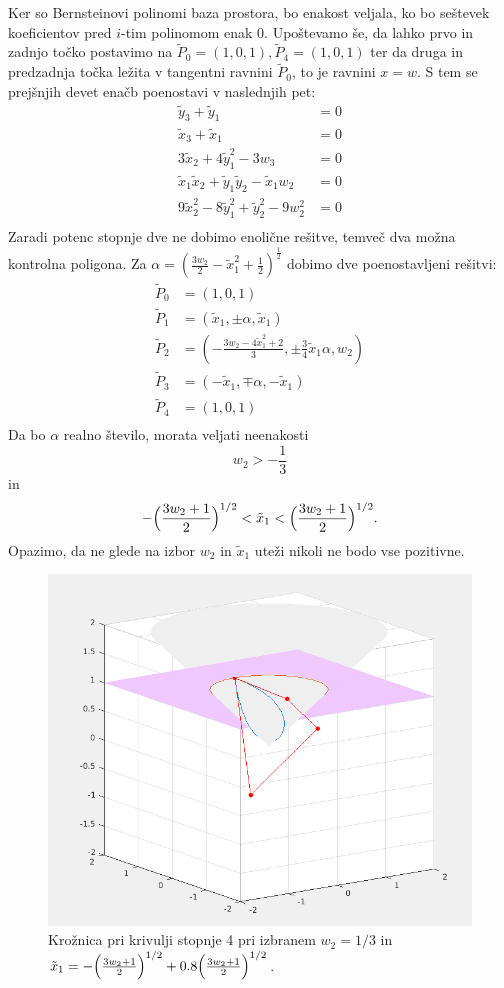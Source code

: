 \documentclass[a4paper,12pt]{article}
\begin{document}
Ker so Bernsteinovi polinomi baza prostora, bo enakost veljala, ko bo seštevek koeficientov pred $i$-tim polinomom enak 0. Upoštevamo še, da lahko prvo in zadnjo točko postavimo na $\tilde{P}_0 = (1,0, 1), \tilde{P}_4 = (1,0, 1)$ ter da druga in predzadnja točka ležita v tangentni ravnini $\tilde{P}_0$, to je ravnini $x = w$. S tem se prejšnjih devet enačb poenostavi v naslednjih pet:
\begin{align*}
\tilde{y}_3 + \tilde{y}_1 &= 0\\
\tilde{x}_3 + \tilde{x}_1 &= 0\\
3\tilde{x}_2 + 4\tilde{y}_1^2 - 3w_3 &= 0 \\
\tilde{x}_1\tilde{x}_2 + \tilde{y}_1\tilde{y}_2  - \tilde{x}_1w_2 &= 0 \\
9\tilde{x}_2^2 - 8\tilde{y}_1^2 + \tilde{y}_2^2 - 9w_2^2&= 0 \\
\end{align*}
Zaradi potenc stopnje dve ne dobimo enolične rešitve, temveč dva možna kontrolna poligona. Za $\alpha = (\frac{3w_2}{2} - \tilde{x}_1^2 + \frac{1}{2})^{\frac{1}{2}}$ dobimo dve poenostavljeni rešitvi:
\begin{align*}
\tilde{P}_0 &= (1,0, 1)\\
\tilde{P}_1 &= (\tilde{x}_1, \pm \alpha,\tilde{x}_1)\\
\tilde{P}_2 &= (-\frac{3w_2 - 4\tilde{x}_1^2+2}{3}, \pm \frac{3}{4}\tilde{x}_1\alpha, w_2)\\
\tilde{P}_3 &= (-\tilde{x}_1, \mp \alpha,-\tilde{x}_1)\\
\tilde{P}_4 &= (1,0,1) \\
\end{align*}
Da bo $\alpha$ realno število, morata veljati neenakosti $$w_2 > -\frac{1}{3}$$ in $$-\Big{(}\frac{3w_2+1}{2}\Big{)}^{1/2} < \tilde{x}_1 < \Big{(}\frac{3w_2+1}{2}\Big{)}^{1/2}.$$
Opazimo, da ne glede na izbor $w_2$ in $\tilde{x}_1$ uteži nikoli ne bodo vse pozitivne.
\begin{figure}[h!]
\includegraphics[scale=0.35]{kvarticna.png}
\centering
\caption{Krožnica pri krivulji stopnje 4 pri izbranem $w_2 = 1/3$ in $\tilde{x}_1 = -\Big{(}\frac{3w_2+1}{2}\Big{)}^{1/2} + 0.8 \Big{(}\frac{3w_2+1}{2}\Big{)}^{1/2}$.}
\end{figure}
\end{document}
